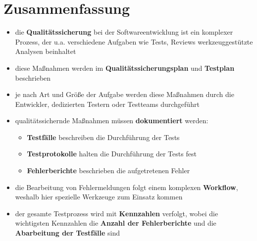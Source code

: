 \section{Zusammenfassung}

\begin{itemize}
    \item die \textbf{Qualitätssicherung} bei der Softwareentwicklung ist ein komplexer Prozess, der u.a. verschiedene Aufgaben wie Tests, Reviews werkzeuggestützte Analysen beinhaltet
    \item diese Maßnahmen werden im \textbf{Qualitätssicherungsplan} und \textbf{Testplan} beschrieben
    \item je nach Art und Größe  der Aufgabe werden diese Maßnahmen durch die Entwickler, dedizierten Testern oder Testteams durchgeführt
    \item qualitätssichernde Maßnahmen müssen \textbf{dokumentiert} werden:
    \begin{itemize}
        \item \textbf{Testfälle} beschreiben die Durchführung der Tests
        \item \textbf{Testprotokolle} halten die Durchführung der Tests fest
        \item \textbf{Fehlerberichte} beschrieben die aufgetretenen Fehler
    \end{itemize}
    \item die Bearbeitung von Fehlermeldungen folgt einem komplexen \textbf{Workflow}, weshalb hier spezielle Werkzeuge zum Einsatz kommen
    \item der gesamte Testprozess wird mit \textbf{Kennzahlen} verfolgt, wobei die wichtigsten Kennzahlen die \textbf{Anzahl der Fehlerberichte} und die \textbf{Abarbeitung der Testfälle} sind
\end{itemize}